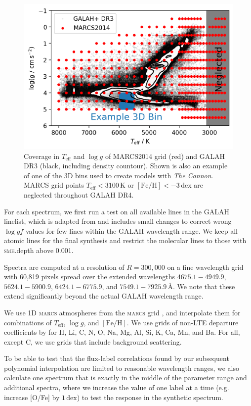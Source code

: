 \documentclass[
  journal=pasa,
  manuscript=research-paper, %
  year=2021,
  volume=37
]{cup-journal}
\newcommand{\Teff}{$T_\mathrm{eff}$\xspace}
\newcommand{\logg}{$\log g$\xspace}
\newcommand{\feh}{$\mathrm{[Fe/H]}$\xspace}
\newcommand{\TheCannon}{\textit{The Cannon}\xspace}
\newcommand{\marcs}{\textsc{marcs}\xspace}
\newcommand{\dex}{\,\mathrm{dex}}	%
\newcommand{\K}{\,\mathrm{K}}	%
\newcommand{\Angstroem}{\,\text{\AA}}	%
\begin{document}
\begin{figure}[hbt!]
 \centering
 \includegraphics[width=\textwidth]{figures/teff_logg_grid_coverage.png}
 \caption{Coverage in \Teff and \logg of MARCS2014 grid (red) and GALAH DR3 (black, including density countour). Shown is also an example of one of the 3D bins used to create models with \TheCannon. MARCS grid points \Teff$ < 3100\K$ or \feh$<-3\dex$ are neglected throughout GALAH DR4.}
 \label{fig:teff_logg_grid_coverage}
\end{figure}

For each spectrum, we first run a test on all available lines in the GALAH linelist, which is adapted from \citet{Heiter2021} and includes small changes to correct wrong $\log gf$ values for few lines within the GALAH wavelength range. We keep all atomic lines for the final synthesis and restrict the molecular lines to those with \textsc{sme}.depth above 0.001.

Spectra are computed at a resolution of $R = 300,000$ on a fine wavelength grid with 60,819 pixels spread over the extended wavelengths $4675.1- 4949.9$, $5624.1-5900.9$, $6424.1-6775.9$, and $7549.1-7925.9 \Angstroem$. We note that these extend significantly beyond the actual GALAH wavelength range.

We use 1D \marcs atmospheres from the \marcs grid \citep[][version 2014]{Gustafsson2008}, and interpolate them for combinations of \Teff, \logg, and \feh. We use grids of non-LTE departure coefficients by \citet{Amarsi2020} for H, Li, C, N, O, Na, Mg, Al, Si, K, Ca, Mn, and Ba. For all, except C, we use grids that include background scattering.

To be able to test that the flux-label correlations found by our subsequent polynomial interpolation are limited to reasonable wavelength ranges, we also calculate one spectrum that is exactly in the middle of the parameter range and additional spectra, where we increase the value of one label at a time (e.g. increase [O/Fe] by $1\dex$) to test the response in the synthetic spectrum.
\end{document}
